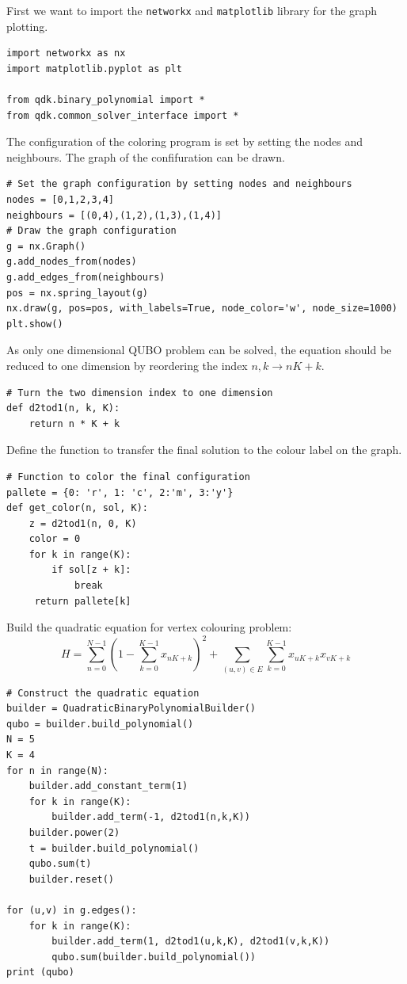 First we want to import the \texttt{networkx} and \texttt{matplotlib} library for the graph plotting.   
\begin{verbatim}
import networkx as nx 
import matplotlib.pyplot as plt 

from qdk.binary_polynomial import * 
from qdk.common_solver_interface import * 
\end{verbatim}
The configuration of the coloring program is set by setting the nodes and neighbours.  The graph of the confifuration can be drawn.
\begin{verbatim}
# Set the graph configuration by setting nodes and neighbours 
nodes = [0,1,2,3,4] 
neighbours = [(0,4),(1,2),(1,3),(1,4)] 
# Draw the graph configuration 
g = nx.Graph() 
g.add_nodes_from(nodes) 
g.add_edges_from(neighbours) 
pos = nx.spring_layout(g) 
nx.draw(g, pos=pos, with_labels=True, node_color='w', node_size=1000) 
plt.show() 
\end{verbatim}
As only one dimensional QUBO problem can be solved, the equation should be reduced to one dimension by reordering the index $n,k \rightarrow nK+k$.
\begin{verbatim}
# Turn the two dimension index to one dimension
def d2tod1(n, k, K):  
    return n * K + k  
\end{verbatim}
Define the function to transfer the final solution to the colour label on the graph.
\begin{verbatim}
# Function to color the final configuration
pallete = {0: 'r', 1: 'c', 2:'m', 3:'y'} 
def get_color(n, sol, K): 
    z = d2tod1(n, 0, K) 
    color = 0 
    for k in range(K): 
        if sol[z + k]: 
            break 
     return pallete[k] 
\end{verbatim}
Build the quadratic equation for vertex colouring problem:
\begin{equation}
H = \sum_{n=0}^{N-1}(1-\sum_{k=0}^{K-1}x_{nK+k})^2 + \sum_{(u,v)\in E}\sum_{k=0}^{K-1}x_{uK+k}x_{vK+k}
\end{equation}
\begin{verbatim}
# Construct the quadratic equation 
builder = QuadraticBinaryPolynomialBuilder() 
qubo = builder.build_polynomial() 
N = 5 
K = 4
for n in range(N):
    builder.add_constant_term(1)
    for k in range(K):
        builder.add_term(-1, d2tod1(n,k,K))
    builder.power(2)
    t = builder.build_polynomial()
    qubo.sum(t)
    builder.reset()

for (u,v) in g.edges():
    for k in range(K): 
        builder.add_term(1, d2tod1(u,k,K), d2tod1(v,k,K))
        qubo.sum(builder.build_polynomial())
print (qubo) 
\end{verbatim}
